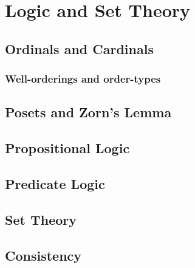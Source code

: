 \documentclass[main.tex]{subfiles}
\begin{document}
	\chapter{Logic and Set Theory}
		\section{Ordinals and Cardinals}
			\subsection{Well-orderings and order-types}
			
		\section{Posets and Zorn's Lemma}
		
		\section{Propositional Logic}
		
		\section{Predicate Logic}
		
		\section{Set Theory}
		
		\section{Consistency}		
\end{document}

